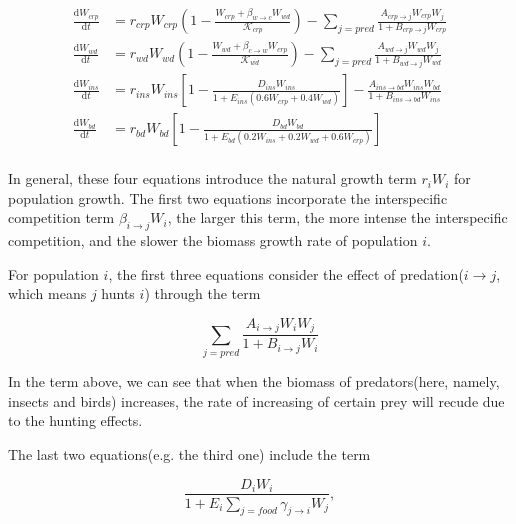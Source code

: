 \documentclass{HZNUMCM}
\begin{document}
      \begin{equation}
        \begin{aligned}
          \frac{\mathrm{d}W_{crp}}{\mathrm{d}t}&=r_{crp}W_{crp}\left( 1-\frac{W_{crp}+\beta _{w\rightarrow c}W_{wd}}{\mathscr{K} _{crp}} \right) -\sum_{{j=pred}}{\frac{A_{crp\rightarrow j}W_{crp}W_{j}}{1+B_{crp\rightarrow j}W_{crp}}}\\
          \frac{\mathrm{d}W_{wd}}{\mathrm{d}t}&=r_{wd}W_{wd}\left( 1-\frac{W_{wd}+\beta _{c\rightarrow w}W_{crp}}{\mathscr{K} _{wd}} \right) -\sum_{{j=pred}}{\frac{A_{wd\rightarrow j}W_{wd}W_{j}}{1+B_{wd\rightarrow j}W_{wd}}}\\
          \frac{\mathrm{d}W_{ins}}{\mathrm{d}t}&=r_{ins}W_{ins}\left[ 1-\frac{D_{ins}W_{ins}}{1+E_{ins}\left( 0.6W_{crp}+0.4W_{wd} \right)} \right] -\frac{A_{ins\rightarrow bd}W_{ins}W_{bd}}{1+B_{ins\rightarrow bd}W_{ins}}\\
          \frac{\mathrm{d}W_{bd}}{\mathrm{d}t} &= r_{bd}W_{bd} \left[ 1 - \frac{D_{bd}W_{bd}}{1 + E_{bd}(0.2W_{ins} + 0.2W_{wd} + 0.6W_{crp})} \right]\\
        \end{aligned} 
      \end{equation}

      In general, these four equations introduce the natural growth term $r_i W_i$ for population growth. 
      The first two equations incorporate the interspecific competition term $\beta_{i \rightarrow j} W_i$, 
      the larger this term, the more intense the interspecific competition, and the slower the biomass growth rate of population $i$. 
      
      For population $i$, the first three equations consider the effect of predation($i\rightarrow j$, which means $j$ hunts $i$) through the term 
      
      \begin{equation}
      \sum_{j=pred}{\frac{A_{i\rightarrow j}W_{i}W_{j}}{1+B_{i\rightarrow j}W_{i}}}
      \end{equation}
      
      In the term above, we can see that when the biomass of predators(here, namely, insects and birds) increases, 
      the rate of increasing of certain prey will recude due to the hunting effects.

      The last two equations(e.g. the third one) include the term 

        \begin{equation}
          \frac{D_{i} W_{i}}{1 + E_{i} \sum_{j=food}{\gamma_{j\rightarrow i} W_{j}}},
        \end{equation}
\end{document}
